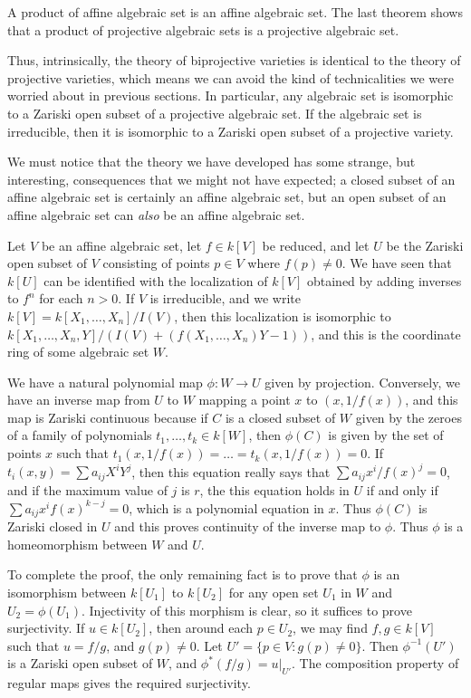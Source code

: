 \begin{example}
    A product of affine algebraic set is an affine algebraic set. The last theorem shows that a product of projective algebraic sets is a projective algebraic set.
\end{example}

Thus, intrinsically, the theory of biprojective varieties is identical to the theory of projective varieties, which means we can avoid the kind of technicalities we were worried about in previous sections. In particular, any algebraic set is isomorphic to a Zariski open subset of a projective algebraic set. If the algebraic set is irreducible, then it is isomorphic to a Zariski open subset of a projective variety.

We must notice that the theory we have developed has some strange, but interesting, consequences that we might not have expected; a closed subset of an affine algebraic set is certainly an affine algebraic set, but an open subset of an affine algebraic set can \emph{also} be an affine algebraic set.

\begin{example}
    Let $V$ be an affine algebraic set, let $f \in k[V]$ be reduced, and let $U$ be the Zariski open subset of $V$ consisting of points $p \in V$ where $f(p) \neq 0$. We have seen that $k[U]$ can be identified with the localization of $k[V]$ obtained by adding inverses to $f^n$ for each $n > 0$. If $V$ is irreducible, and we write $k[V] = k[X_1,\dots,X_n]/I(V)$, then this localization is isomorphic to $k[X_1,\dots,X_n,Y]/(I(V) + (f(X_1,\dots,X_n)Y - 1))$, and this is the coordinate ring of some algebraic set $W$.

    We have a natural polynomial map $\phi: W \to U$ given by projection. Conversely, we have an inverse map from $U$ to $W$ mapping a point $x$ to $(x,1/f(x))$, and this map is Zariski continuous because if $C$ is a closed subset of $W$ given by the zeroes of a family of polynomials $t_1,\dots,t_k \in k[W]$, then $\phi(C)$ is given by the set of points $x$ such that $t_1(x,1/f(x)) = \dots = t_k(x,1/f(x)) = 0$. If $t_i(x,y) = \sum a_{ij} X^i Y^j$, then this equation really says that $\sum a_{ij} x^i / f(x)^j = 0$, and if the maximum value of $j$ is $r$, the this equation holds in $U$ if and only if $\sum a_{ij} x^i f(x)^{k-j} = 0$, which is a polynomial equation in $x$. Thus $\phi(C)$ is Zariski closed in $U$ and this proves continuity of the inverse map to $\phi$. Thus $\phi$ is a homeomorphism between $W$ and $U$.

    To complete the proof, the only remaining fact is to prove that $\phi$ is an isomorphism between $k[U_1]$ to $k[U_2]$ for any open set $U_1$ in $W$ and $U_2 = \phi(U_1)$. Injectivity of this morphism is clear, so it suffices to prove surjectivity. If $u \in k[U_2]$, then around each $p \in U_2$, we may find $f,g \in k[V]$ such that $u = f/g$, and $g(p) \neq 0$. Let $U' = \{ p \in V : g(p) \neq 0 \}$. Then $\phi^{-1}(U')$ is a Zariski open subset of $W$, and $\phi^*(f/g) = u|_{U'}$. The composition property of regular maps gives the required surjectivity.
\end{example}

